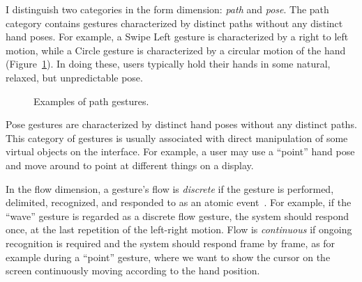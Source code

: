 I distinguish two
categories in the form dimension: \textit{path} and \textit{pose}. The
path category contains gestures characterized by distinct paths without any distinct
hand poses. For example, a Swipe Left gesture is characterized by a
right to left motion, while a Circle gesture is characterized by a
circular motion of the hand (Figure~\ref{fig:path-gestures}). In doing these,
users typically hold their hands in some natural, relaxed, but unpredictable pose. 

\begin{figure}[tbh]
\centering
{}
\caption{Examples of path gestures.}
\label{fig:path-gestures}
\end{figure}

Pose
gestures are characterized by distinct hand poses without any distinct paths.
This category of gestures is usually associated with direct manipulation of some virtual
objects on the interface.
For example, a user may use a ``point'' hand pose and move around to
point at different things on a display.

In the flow dimension, a gesture's flow is
\textit{discrete} if the gesture is performed, delimited, recognized, and
responded to as an atomic event~\cite{wobbrock09}. For example, if the ``wave'' gesture is
regarded as a discrete flow gesture, the system should respond once, at the last
repetition of the left-right motion. Flow is \textit{continuous} if ongoing
recognition is required and the system should respond frame by frame, as for example during a ``point'' gesture, where we want to show the cursor on the screen
continuously moving according to the hand position. 

